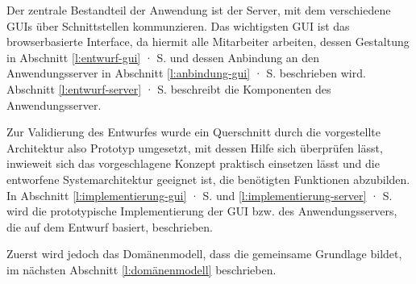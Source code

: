 Der zentrale Bestandteil der Anwendung ist der Server, mit dem verschiedene GUIs über Schnittstellen kommunzieren. Das wichtigsten GUI ist das browserbasierte Interface, da hiermit alle Mitarbeiter arbeiten, dessen Gestaltung in Abschnitt \ref{l:entwurf-gui} · S.\pageref{l:entwurf-gui} und dessen Anbindung an den Anwendungsserver in Abschnitt \ref{l:anbindung-gui} · S.\pageref{l:anbindung-gui} beschrieben wird. Abschnitt \ref{l:entwurf-server} · S.\pageref{l:entwurf-server} beschreibt die Komponenten des Anwendungsserver. 

Zur Validierung des Entwurfes wurde ein Querschnitt durch die vorgestellte Architektur also Prototyp umgesetzt, mit dessen Hilfe sich überprüfen lässt, inwieweit sich das vorgeschlagene Konzept praktisch einsetzen lässt und die entworfene Systemarchitektur geeignet ist, die benötigten Funktionen abzubilden. In Abschnitt \ref{l:implementierung-gui} · S.\pageref{l:implementierung-gui} und \ref{l:implementierung-server} · S.\pageref{l:implementierung-server} wird die prototypische Implementierung der GUI bzw. des Anwendungsservers, die auf dem Entwurf basiert, beschrieben.

Zuerst wird jedoch das Domänenmodell, dass die gemeinsame Grundlage bildet, im nächsten Abschnitt \ref{l:domänenmodell} beschrieben.

















\pagebreak
